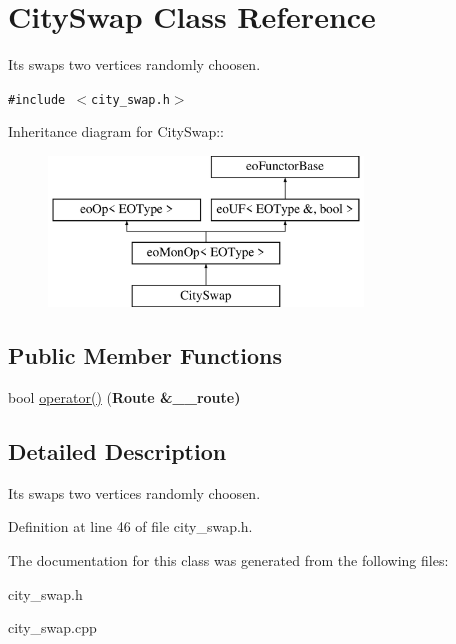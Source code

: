 \hypertarget{classCitySwap}{
\section{City\-Swap Class Reference}
\label{classCitySwap}
}
Its swaps two vertices randomly choosen.  


{\tt \#include $<$city\_\-swap.h$>$}

Inheritance diagram for City\-Swap::\begin{figure}[H]
\begin{center}
\leavevmode
\includegraphics[height=4cm]{classCitySwap}
\end{center}
\end{figure}
\subsection*{Public Member Functions}
\begin{CompactItemize}
\item 
\hypertarget{classCitySwap_7e6958b62048c89604cbf046b86bdf2d}{
bool \hyperlink{classCitySwap_7e6958b62048c89604cbf046b86bdf2d}{operator()} (\bf{Route} \&\_\-\_\-route)}
\label{classCitySwap_7e6958b62048c89604cbf046b86bdf2d}

\end{CompactItemize}


\subsection{Detailed Description}
Its swaps two vertices randomly choosen. 



Definition at line 46 of file city\_\-swap.h.

The documentation for this class was generated from the following files:\begin{CompactItemize}
\item 
city\_\-swap.h\item 
city\_\-swap.cpp\end{CompactItemize}
